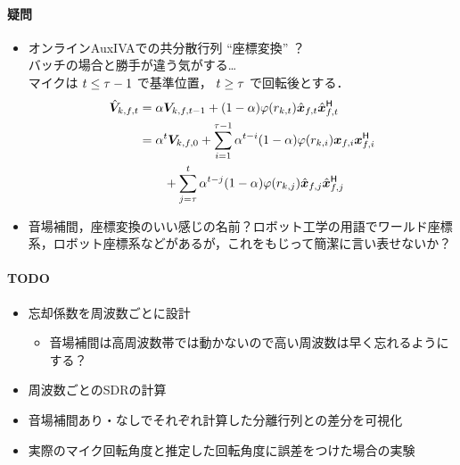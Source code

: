 \documentclass[sip,biber]{now-journal}
\begin{document}
\paragraph*{疑問}
\begin{itemize}
  \item オンラインAuxIVAでの共分散行列 ``座標変換'' ？\\ バッチの場合と勝手が違う気がする…\\
    マイクは $t \leq \tau - 1$ で基準位置，
    $t \geq \tau$ で回転後とする．
    \begin{align*}
      \rot{\cov} _{\src,\ft} &= \forget \cov _{\src,\ft[-1]} + (1 - \forget) \weight(\var _{\src,\tframe}) \rot{\Obs} _{\ft} \rot{\Obs} _{\ft} ^{\hermite} \\
                             &= \forget ^{\tframe} \cov _{\src,\freq,0}
                                + \sum _{i = 1} ^{\rotFra - 1} \forget ^{\tframe - i} (1 - \forget) \weight(\var _{\src,i}) \Obs _{\freq,i} \Obs _{\freq,i} ^{\hermite} \\
                             &\qquad + \sum _{j = \rotFra} ^{\tframe} \forget ^{\tframe - j} (1 - \forget) \weight(\var _{\src,j}) \rot{\Obs} _{\freq,j} \rot{\Obs} _{\freq,j} ^{\hermite}
    \end{align*}
  \item 音場補間，座標変換のいい感じの名前？ロボット工学の用語でワールド座標系，ロボット座標系などがあるが，これをもじって簡潔に言い表せないか？
\end{itemize}

\paragraph*{TODO}
\begin{itemize}
  \item 忘却係数を周波数ごとに設計
    \begin{itemize}
      \item 音場補間は高周波数帯では動かないので高い周波数は早く忘れるようにする？
    \end{itemize}
  \item 周波数ごとのSDRの計算
  \item 音場補間あり・なしでそれぞれ計算した分離行列との差分を可視化
  \item 実際のマイク回転角度と推定した回転角度に誤差をつけた場合の実験
\end{itemize}
\end{document}
